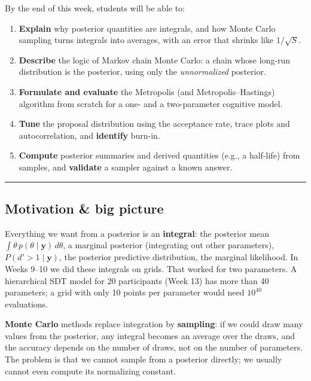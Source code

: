 By the end of this week, students will be able to:

\begin{enumerate}
\def\labelenumi{\arabic{enumi}.}
\tightlist
\item
  \textbf{Explain} why posterior quantities are integrals, and how Monte
  Carlo sampling turns integrals into averages, with an error that
  shrinks like \(1/\sqrt{S}\).
\item
  \textbf{Describe} the logic of Markov chain Monte Carlo: a chain whose
  long-run distribution is the posterior, using only the
  \emph{unnormalized} posterior.
\item
  \textbf{Formulate and evaluate} the Metropolis (and Metropolis--Hastings) algorithm
  from scratch for a one- and a two-parameter cognitive model.
\item
  \textbf{Tune} the proposal distribution using the acceptance rate,
  trace plots and autocorrelation, and \textbf{identify} burn-in.
\item
  \textbf{Compute} posterior summaries and derived quantities (e.g., a
  half-life) from samples, and \textbf{validate} a sampler against a
  known answer.
\end{enumerate}

\begin{center}\rule{0.5\linewidth}{0.5pt}\end{center}

\subsection{Motivation \& big picture}

Everything we want from a posterior is an \textbf{integral}: the
posterior mean \(\int \theta\, p(\theta\mid\mathbf{y})\,d\theta\), a
marginal posterior (integrating out other parameters),
\(P(d' > 1\mid\mathbf{y})\), the posterior predictive distribution, the
marginal likelihood. In Weeks 9--10 we did these integrals on grids.
That worked for two parameters. A hierarchical SDT model for 20
participants (Week 13) has more than 40 parameters; a grid with only 10
points per parameter would need \(10^{40}\) evaluations.

\textbf{Monte Carlo} methods replace integration by \textbf{sampling}:
if we could draw many values from the posterior, any integral becomes an
average over the draws, and the accuracy depends on the number of draws,
not on the number of parameters. The problem is that we cannot sample
from a posterior directly; we usually cannot even compute its
normalizing constant.

